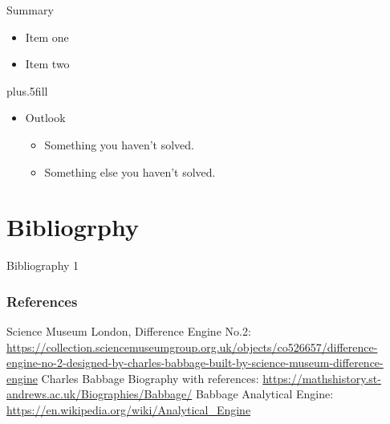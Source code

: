 \documentclass{beamer}
\begin{document}
\begin{frame}{Summary}

  \begin{itemize}
  \item
    Item one
  \item
    Item two
  \end{itemize}
  
  \vskip0pt plus.5fill
  \begin{itemize}
  \item
    Outlook
    \begin{itemize}
    \item
      Something you haven't solved.
    \item
      Something else you haven't solved.
    \end{itemize}
  \end{itemize}
\end{frame}


\section{Bibliogrphy}

\begin{frame}{Bibliography 1}
  \frametitle{References}
  
  \begin{thebibliography}{Babbage Difference Engine}
    Science Museum London, Difference Engine No.2: {\url{https://collection.sciencemuseumgroup.org.uk/objects/co526657/difference-engine-no-2-designed-by-charles-babbage-built-by-science-museum-difference-engine}}
    Charles Babbage Biography with references: {\url{https://mathshistory.st-andrews.ac.uk/Biographies/Babbage/}}
    Babbage Analytical Engine: {\url{https://en.wikipedia.org/wiki/Analytical_Engine}}
  \end{thebibliography}
\end{frame}
\end{document}
